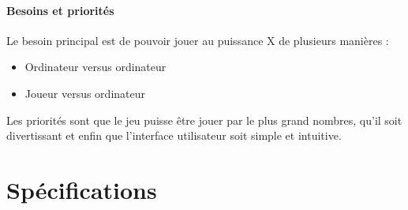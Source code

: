 \documentclass[a4paper,oneside]{article}
\begin{document}
\paragraph{Besoins et priorités\\}
Le besoin principal est de pouvoir jouer au puissance X de plusieurs manières :
\begin{itemize}
	\item Ordinateur versus ordinateur
	\item Joueur versus ordinateur
\end{itemize}
Les priorités sont que le jeu puisse être jouer par le plus grand nombres, qu'il soit divertissant et enfin que l'interface utilisateur soit  simple et intuitive.



\newpage

\section{Spécifications}
\end{document}

